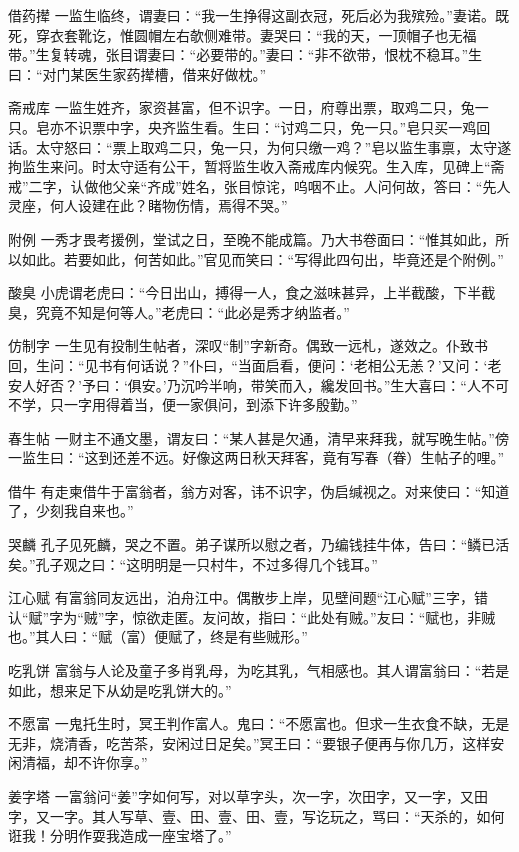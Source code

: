 \documentclass[12pt,UTF8]{ctexbook}
\begin{document}
借药撵
一监生临终，谓妻曰：“我一生挣得这副衣冠，死后必为我殡殓。”妻诺。既死，穿衣套靴讫，惟圆帽左右欹侧难带。妻哭曰：“我的天，一顶帽子也无福带。”生复转魂，张目谓妻曰：“必要带的。”妻曰：“非不欲带，恨枕不稳耳。”生曰：“对门某医生家药撵槽，借来好做枕。”

斋戒库
一监生姓齐，家资甚富，但不识字。一日，府尊出票，取鸡二只，兔一只。皂亦不识票中字，央齐监生看。生曰：“讨鸡二只，免一只。”皂只买一鸡回话。太守怒曰：“票上取鸡二只，兔一只，为何只缴一鸡？”皂以监生事禀，太守遂拘监生来问。时太守适有公干，暂将监生收入斋戒库内候究。生入库，见碑上“斋戒”二字，认做他父亲“齐成”姓名，张目惊诧，呜咽不止。人问何故，答曰：“先人灵座，何人设建在此？睹物伤情，焉得不哭。”

附例
一秀才畏考援例，堂试之日，至晚不能成篇。乃大书卷面曰：“惟其如此，所以如此。若要如此，何苦如此。”官见而笑曰：“写得此四句出，毕竟还是个附例。”

酸臭
小虎谓老虎曰：“今日出山，搏得一人，食之滋味甚异，上半截酸，下半截臭，究竟不知是何等人。”老虎曰：“此必是秀才纳监者。”

仿制字
一生见有投制生帖者，深叹“制”字新奇。偶致一远札，遂效之。仆致书回，生问：“见书有何话说？”仆曰，“当面启看，便问：‘老相公无恙？’又问：‘老安人好否？’予曰：‘俱安。’乃沉吟半响，带笑而入，纔发回书。”生大喜曰：“人不可不学，只一字用得着当，便一家俱问，到添下许多殷勤。”

春生帖
一财主不通文墨，谓友曰：“某人甚是欠通，清早来拜我，就写晚生帖。”傍一监生曰：“这到还差不远。好像这两日秋天拜客，竟有写春（眷）生帖子的哩。”

借牛
有走柬借牛于富翁者，翁方对客，讳不识字，伪启缄视之。对来使曰：“知道了，少刻我自来也。”

哭麟
孔子见死麟，哭之不置。弟子谋所以慰之者，乃编钱挂牛体，告曰：“鳞已活矣。”孔子观之曰：“这明明是一只村牛，不过多得几个钱耳。”

江心赋
有富翁同友远出，泊舟江中。偶散步上岸，见壁间题“江心赋”三字，错认“赋”字为“贼”字，惊欲走匿。友问故，指曰：“此处有贼。”友曰：“赋也，非贼也。”其人曰：“赋（富）便赋了，终是有些贼形。”

吃乳饼
富翁与人论及童子多肖乳母，为吃其乳，气相感也。其人谓富翁曰：“若是如此，想来足下从幼是吃乳饼大的。”

不愿富
一鬼托生时，冥王判作富人。鬼曰：“不愿富也。但求一生衣食不缺，无是无非，烧清香，吃苦茶，安闲过日足矣。”冥王曰：“要银子便再与你几万，这样安闲清福，却不许你享。”

姜字塔
一富翁问“姜”字如何写，对以草字头，次一字，次田字，又一字，又田字，又一字。其人写草、壹、田、壹、田、壹，写讫玩之，骂曰：“天杀的，如何诳我！分明作耍我造成一座宝塔了。”
\end{document}
